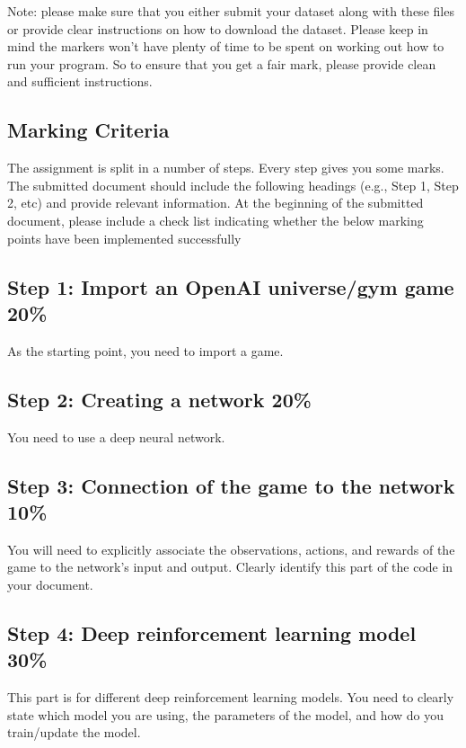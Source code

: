 \documentclass[12pt,a4]{article}
\begin{document}
Note: please make sure that you either submit your dataset along with these files or provide clear instructions on how to download the dataset. Please keep in mind the markers won't have plenty of time to be spent on working out how to run your program. So to ensure that you get a fair mark, please provide clean and sufficient instructions.

\subsection{Marking Criteria}\label{sec:marking}
The assignment is split in a number of steps. Every step gives you some marks. 
The submitted document should include the following headings (e.g., Step 1, Step 2, etc) and provide relevant information. 
At the beginning of the submitted document, please include a check list indicating whether the below marking points have been implemented successfully


\subsection*{Step 1: Import an OpenAI universe/gym game 20\%}

As the starting point, you need to import a game. 


\subsection*{Step 2: Creating a network 20\%}

You need to use a deep neural network. 


\subsection*{Step 3: Connection of the game to the network 10\%}

You will need to explicitly associate the observations, actions, and rewards of the game to the network's input and output. Clearly identify this part of the code in your document. 

\subsection*{Step 4: Deep reinforcement learning model 30\%}

This part is for different deep reinforcement learning models. You need to clearly state which model you are using, the parameters of the model, and how do you train/update the model. 
\end{document}
